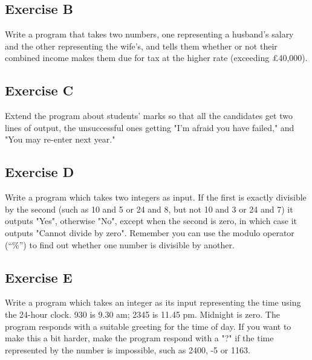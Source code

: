 
\subsection*{Exercise B}

Write a program that takes two numbers, one representing a
husband's salary and the other representing the wife's, and tells them
whether or not their combined income makes them due for tax at the higher rate
(exceeding \pounds 40,000).

\subsection*{Exercise C}

Extend the program about students' marks so that all the candidates
get two lines of output, the unsuccessful ones getting "I'm afraid you
have failed," and "You may re-enter next year."

\subsection*{Exercise D}

Write a program which takes two integers as input.
If the first is exactly divisible
by the second (such as 10 and 5 or 24 and 8, but not 10 and 3 or 24 and 7)
it outputs "Yes", otherwise "No", except when the second
is zero, in which case it outputs "Cannot divide by zero". Remember
you can use the modulo operator (``\%'') to find out whether one
number is divisible by another. 

\subsection*{Exercise E}

Write a program which takes an integer as its input representing the time
using the 24-hour clock.  930 is 9.30 am; 2345 is 11.45 pm.  Midnight is
zero. The program responds with a suitable greeting for the time of day.
If you want to make this a bit harder, make the program respond with a "?"
if the time represented by the number is impossible, such as 2400, -5 or
1163.




